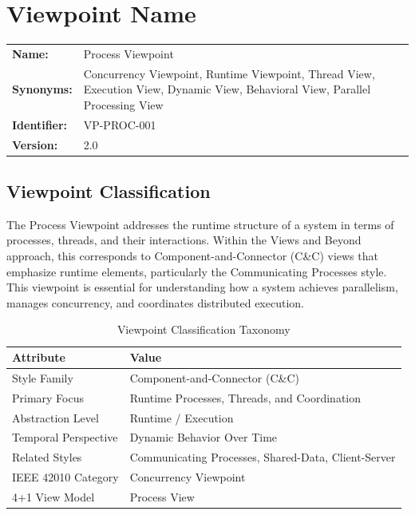 \documentclass[11pt,letterpaper]{article}
\begin{document}
\section{Viewpoint Name}

\begin{definitionbox}
\begin{tabular}{@{}L{3.5cm}L{10cm}@{}}
\textbf{Name:} & Process Viewpoint \\[0.5em]
\textbf{Synonyms:} & Concurrency Viewpoint, Runtime Viewpoint, Thread View, Execution View, Dynamic View, Behavioral View, Parallel Processing View \\[0.5em]
\textbf{Identifier:} & VP-PROC-001 \\[0.5em]
\textbf{Version:} & 2.0 \\
\end{tabular}
\end{definitionbox}

\subsection{Viewpoint Classification}

The Process Viewpoint addresses the runtime structure of a system in terms of processes, threads, and their interactions. Within the Views and Beyond approach, this corresponds to Component-and-Connector (C\&C) views that emphasize runtime elements, particularly the Communicating Processes style. This viewpoint is essential for understanding how a system achieves parallelism, manages concurrency, and coordinates distributed execution.

\begin{table}[H]
\centering
\caption{Viewpoint Classification Taxonomy}
\begin{tabular}{@{}L{4cm}L{10cm}@{}}
\toprule
\textbf{Attribute} & \textbf{Value} \\
\midrule
Style Family & Component-and-Connector (C\&C) \\
Primary Focus & Runtime Processes, Threads, and Coordination \\
Abstraction Level & Runtime / Execution \\
Temporal Perspective & Dynamic Behavior Over Time \\
Related Styles & Communicating Processes, Shared-Data, Client-Server \\
IEEE 42010 Category & Concurrency Viewpoint \\
4+1 View Model & Process View \\
\bottomrule
\end{tabular}
\end{table}
\end{document}
